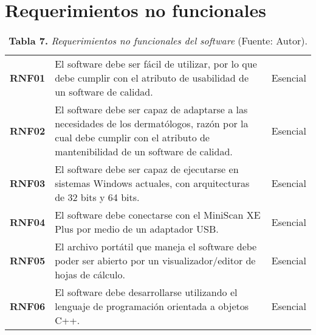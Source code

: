 \section{Requerimientos no funcionales}
\FloatBarrier
	\begin{table}[htb]
		\small
		\caption{\textbf{Tabla 7.} \textit{Requerimientos no funcionales del software} (Fuente: Autor).}
		\centering
		\setlength{\extrarowheight}{\altocelda}
		\begin{tabulary}{\anchotabla}{|c|J|c|}
			\hline
			 &  & \\ \hline
			\textbf{RNF01} & El software debe ser f\'{a}cil de utilizar, por lo que debe cumplir con el atributo de usabilidad de un software de calidad. & Esencial\\ \hline
			\textbf{RNF02} & El software debe ser capaz de adaptarse a las necesidades de los dermat\'{o}logos, raz\'{o}n por la cual debe cumplir con el atributo de mantenibilidad de un software de calidad. & Esencial\\ \hline
			\textbf{RNF03} & El software debe ser capaz de ejecutarse en sistemas Windows actuales, con arquitecturas de 32 bits y 64 bits. & Esencial\\ \hline
			\textbf{RNF04} & El software debe conectarse con el MiniScan XE Plus por medio de un adaptador USB. & Esencial\\ \hline
			\textbf{RNF05} & El archivo port\'{a}til que maneja el software debe poder ser abierto por un visualizador/editor de hojas de c\'{a}lculo. & Esencial\\ \hline
			\textbf{RNF06} & El software debe desarrollarse utilizando el lenguaje de programaci\'{o}n orientada a objetos C++. & Esencial\\ \hline
		\end{tabulary}
	\end{table}
\FloatBarrier %